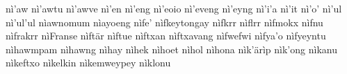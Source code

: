 nì'aw\hspace{2mm}
nì'awtu\hspace{2mm}
nì'awve\hspace{2mm}
nì'en\hspace{2mm}
nì'eng\hspace{2mm}
nì'eoio\hspace{2mm}
nì'eveng\hspace{2mm}
nì'eyng\hspace{2mm}
nì'i'a\hspace{2mm}
nì'it\hspace{2mm}
nì'o'\hspace{2mm}
nì'ul\hspace{2mm}
nì'ul'ul\hspace{2mm}
nìawnomum\hspace{2mm}
nìayoeng\hspace{2mm}
nìfe'\hspace{2mm}
nìfkeytongay\hspace{2mm}
nìfkrr\hspace{2mm}
nìflrr\hspace{2mm}
nìfmokx\hspace{2mm}
nìfnu\hspace{2mm}
nìfrakrr\hspace{2mm}
nìFranse\hspace{2mm}
nìftär\hspace{2mm}
nìftue\hspace{2mm}
nìftxan\hspace{2mm}
nìftxavang\hspace{2mm}
nìfwefwi\hspace{2mm}
nìfya'o\hspace{2mm}
nìfyeyntu\hspace{2mm}
nìhawmpam\hspace{2mm}
nìhawng\hspace{2mm}
nìhay\hspace{2mm}
nìhek\hspace{2mm}
nìhoet\hspace{2mm}
nìhol\hspace{2mm}
nìhona\hspace{2mm}
nìk'ärìp\hspace{2mm}
nìk'ong\hspace{2mm}
nìkanu\hspace{2mm}
nìkeftxo\hspace{2mm}
nìkelkin\hspace{2mm}
nìkemweypey\hspace{2mm}
nìklonu\hspace{2mm}
